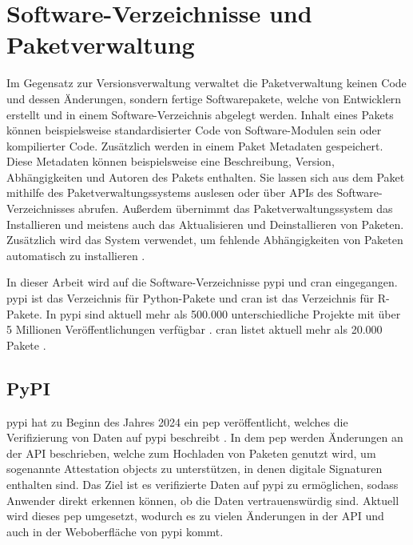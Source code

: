 \section{Software-Verzeichnisse und Paketverwaltung}
\label{sec:paketverwaltung}
Im Gegensatz zur Versionsverwaltung verwaltet die Paketverwaltung keinen Code und dessen Änderungen, sondern fertige Softwarepakete, welche von Entwicklern erstellt und in einem Software-Verzeichnis abgelegt werden.
Inhalt eines Pakets können beispielsweise standardisierter Code von Software-Modulen sein oder kompilierter Code.
Zusätzlich werden in einem Paket Metadaten gespeichert.
Diese Metadaten können beispielsweise eine Beschreibung, Version, Abhängigkeiten und Autoren des Pakets enthalten.
Sie lassen sich aus dem Paket mithilfe des Paketverwaltungssystems auslesen oder über APIs des Software-Verzeichnisses abrufen.
Außerdem übernimmt das Paketverwaltungssystem das Installieren und meistens auch das Aktualisieren und Deinstallieren von Paketen.
Zusätzlich wird das System verwendet, um fehlende Abhängigkeiten von Paketen automatisch zu installieren \autocite{spinellis_package_2012}.

In dieser Arbeit wird auf die Software-Verzeichnisse \gls{pypi} und \gls{cran} eingegangen.
\gls{pypi} ist das Verzeichnis für Python-Pakete und \gls{cran} ist das Verzeichnis für R-Pakete.
In \gls{pypi} sind aktuell mehr als 500.000 unterschiedliche Projekte mit über 5 Millionen Veröffentlichungen verfügbar \autocite{python_software_foundation_pypi_2024}.
\gls{cran} listet aktuell mehr als 20.000 Pakete \autocite{cran_team_comprehensive_2024}.

\subsection{PyPI}
\label{subsec:paketverwaltung_pypi}
\gls{pypi} hat zu Beginn des Jahres 2024 ein \gls{pep} veröffentlicht, welches die Verifizierung von Daten auf \gls{pypi} beschreibt \autocite{python_software_foundation_pep_2024}.
In dem \gls{pep} werden Änderungen an der API beschrieben, welche zum Hochladen von Paketen genutzt wird, um sogenannte \glqq Attestation objects\grqq{} zu unterstützen, in denen digitale Signaturen enthalten sind.
Das Ziel ist es verifizierte Daten auf \gls{pypi} zu ermöglichen, sodass Anwender direkt erkennen können, ob die Daten vertrauenswürdig sind.
Aktuell wird dieses \gls{pep} umgesetzt, wodurch es zu vielen Änderungen in der API und auch in der Weboberfläche von \gls{pypi} kommt.

